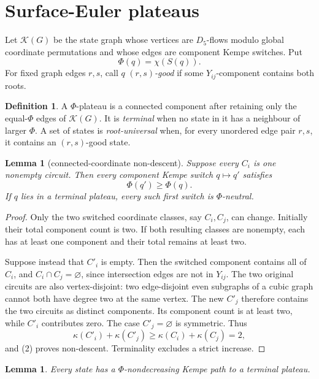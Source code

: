 \documentclass[11pt]{article}
\newtheorem{lemma}[theorem]{Lemma}
\theoremstyle{definition}
\newtheorem{definition}[theorem]{Definition}
\theoremstyle{remark}
\newcommand{\kap}{\kappa}
\begin{document}
\section{Surface-Euler plateaus}

Let \(\mathcal K(G)\) be the state graph whose vertices are \(D_5\)-flows
modulo global coordinate permutations and whose edges are component
Kempe switches.  Put
\[
 \Phi(q)=\chi(S(q)).
\]
For fixed graph edges \(r,s\), call \(q\) \emph{\((r,s)\)-good} if some
\(Y_{ij}\)-component contains both roots.

\begin{definition}
A \(\Phi\)-plateau is a connected component after retaining only the
equal-\(\Phi\) edges of \(\mathcal K(G)\).  It is \emph{terminal} when no
state in it has a neighbour of larger \(\Phi\).  A set of states is
\emph{root-universal} when, for every unordered edge pair \(r,s\), it
contains an \((r,s)\)-good state.
\end{definition}

\begin{lemma}[connected-coordinate non-descent]\label{lem:connected-coordinates}
Suppose every \(C_i\) is one nonempty circuit.  Then every component Kempe
switch \(q\mapsto q'\) satisfies
\[
 \Phi(q')\geq\Phi(q).
\]
If \(q\) lies in a terminal plateau, every such first switch is
\(\Phi\)-neutral.
\end{lemma}

\begin{proof}
Only the two switched coordinate classes, say \(C_i,C_j\), can change.
Initially their total component count is two.  If both resulting classes
are nonempty, each has at least one component and their total remains at
least two.

Suppose instead that \(C'_i\) is empty.  Then the switched component
contains all of \(C_i\), and \(C_i\cap C_j=\varnothing\), since intersection
edges are not in \(Y_{ij}\).  The two original circuits are also
vertex-disjoint: two edge-disjoint even subgraphs of a cubic graph cannot
both have degree two at the same vertex.  The new \(C'_j\) therefore
contains the two circuits as distinct components.  Its component count is
at least two, while \(C'_i\) contributes zero.  The case \(C'_j=\varnothing\)
is symmetric.  Thus
\[
 \kap(C'_i)+\kap(C'_j)\geq
 \kap(C_i)+\kap(C_j)=2,
\]
and (2) proves non-descent.  Terminality excludes a strict increase.
\end{proof}

\begin{lemma}\label{lem:reach-terminal}
Every state has a \(\Phi\)-nondecreasing Kempe path to a terminal plateau.
\end{lemma}
\end{document}
